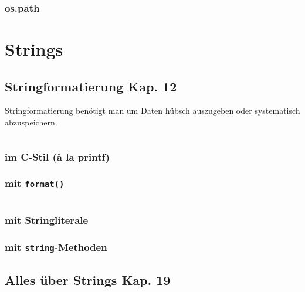 \subsubsection{os.path}


\section{Strings}

\subsection[Stringformatierung]{Stringformatierung \tiny{Kap. 12}}
Stringformatierung benötigt man um Daten hübsch auszugeben oder systematisch abzuspeichern.\\
\begin{minipage}[t]{0.49\textwidth}
	
\end{minipage}
\begin{minipage}[t]{0.02\textwidth} $ \quad $ \end{minipage}
\begin{minipage}[t]{0.49\textwidth}
	
\end{minipage}

\subsubsection{im C-Stil (à la printf)}


\begin{minipage}[t]{0.49\textwidth}
	\subsubsection{mit \texttt{format()}}
	
\end{minipage}
\begin{minipage}[t]{0.02\textwidth} $ \quad $ \end{minipage}
\begin{minipage}[t]{0.49\textwidth}
	\subsubsection{mit Stringliterale}
	
	
	\subsubsection{mit \texttt{string}-Methoden}
	
	
	\subsection{Alles über Strings \tiny{Kap. 19}}
	
\end{minipage}



